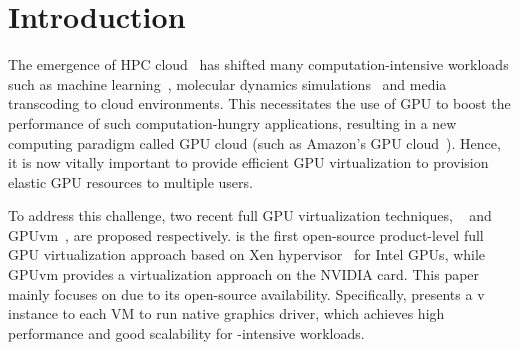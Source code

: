 \section{Introduction}
\label{sec:introduction}

The emergence of HPC cloud~\cite{vecchiola2009high} has shifted many
computation-intensive workloads such as machine learning~\cite{lopes2011gpumlib}, 
molecular dynamics simulations~\cite{yang2007gpu}  and media transcoding to
cloud environments. This necessitates the use of GPU to boost the performance
of such computation-hungry applications, resulting in a new computing
paradigm called GPU cloud (such as Amazon's GPU cloud~\cite{aws-hpc}).
Hence, it is now vitally important to provide efficient GPU virtualization
to provision elastic GPU resources to multiple users.

\iffalse
As virtualization technology has been successfully applied to a variety of devices, the \gpu{} has become an indispensable building block within virtualization systems. This has lead to the scope that its applicability being greatly expanded from graphic computing acceleration to high performance computing. The current standard from many parallel applications choose \gpu{}s for general purpose computing (GPGPU)~{\cite{luebke2006gpgpu}}, such as machine learning~{\cite{lopes2011gpumlib}} and molecular dynamics simulations~\cite{yang2007gpu}. At the same time, virtualization technology has significantly influenced how resources are managed in cloud data center. \gpu{} virtualization extends today's elastic resource management capability from CPU to \gpu{}, which enables efficient hosting of \gpu{} workloads within cloud and data center environment.
\fi

To address this challenge, two recent full GPU virtualization techniques, \gvirt{}~{\cite{tian2014full}} and GPUvm~{\cite{suzuki2014gpuvm}}, are proposed 
respectively. \gvirt{} is the first open-source product-level full GPU virtualization approach based on Xen hypervisor~{\cite{barham2003xen}} for Intel GPUs, while GPUvm provides a \gpu{} virtualization approach on the NVIDIA card. 
This paper mainly focuses on \gvirt{} due to its open-source availability.
Specifically,  \gvirt{} presents a v\gpu{} instance to each VM to run native graphics driver,
which achieves high performance and good scalability for \gpu{}-intensive workloads.

